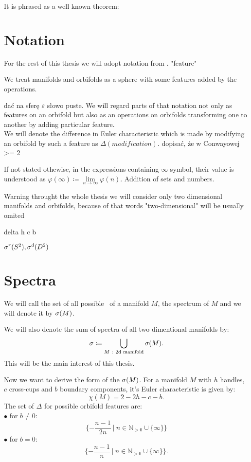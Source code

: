 It is phrased as a well known theorem:
\cite{}

\section{Notation}

For the rest of this thesis we will adopt notation from \cite{}.
"feature"

We treat manifolds and orbifolds as a sphere with some features added by the operations.

dać na sferę $\varepsilon$ słowo puste.
We will regard parts of that notation not only as features on an orbifold but also as an operations 
on orbifolds transforming one to another by adding particular feature. \\
We will denote the difference in Euler characteristic which is made by modifying 
an orbifold by such a feature as $\Delta(modification)$.
dopisać, że w Conwayowej >= 2

If not stated othewise, in the expressions containing $\infty$ symbol, their value is understood 
as $\varphi(\infty) \coloneqq \lim\limits_{n\to \infty}\varphi(n)$.
\todo{}
Addition of sets and numbers.

Warning throught the whole thesis we will consider only two dimensional manifolds and 
orbifolds, because of that words "two-dimensional" will be usually omited 

delta
h c b

${\sigma^r(S^2)}, {\sigma^d(D^2)}$ 

\section{Spectra}
We will call the set of all possible \Eoc\ of a manifold $M$, the spectrum of $M$ and 
we will denote it by ${{\sigma}(M)}$. 

We will also denote the sum of spectra of all two dimentional manifolds by:
\begin{equation}
{\sigma} \coloneqq \bigcup_{M\textrm{ : 2d manifold}} {{\sigma}(M)}.
\end{equation}
This will be the main interest of this thesis. 

Now we want to derive the form of the ${{\sigma}(M)}$.
For a manifold $M$ with $h$ handles, $c$ cross-cups and $b$ boundary components, it's 
Euler characteristic is given by:
\begin{equation}
\chi(M) = 2-2h-c-b.
\end{equation}
The set of $\Delta$ for possible orbifold features are:\\
$\bullet$ for $b\neq 0$:
\begin{equation}
\{-\frac{n-1}{2n}\ \big|\ n\in\mathbb{N}_{>0}\cup \{\infty\}\}
\end{equation}
$\bullet$ for $b = 0$:
\begin{equation}
\{-\frac{n-1}{n}\ \big|\ n\in\mathbb{N}_{>0}\cup \{\infty\}\}.
\end{equation} 


